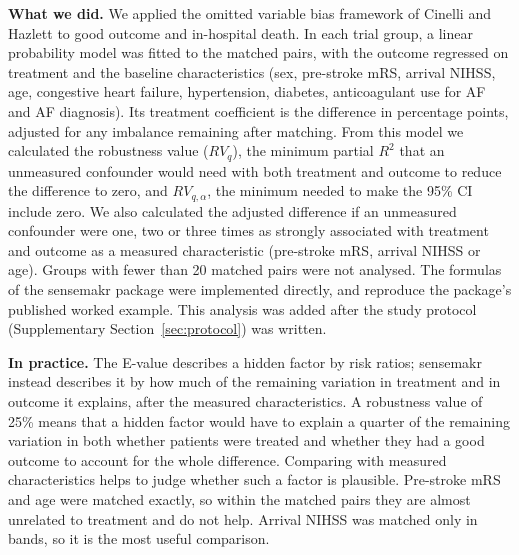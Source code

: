 \textbf{What we did.} We applied the omitted variable bias framework of Cinelli and Hazlett\cite{cinelli_making_2020} to good outcome and in-hospital death. In each trial group, a linear probability model was fitted to the matched pairs, with the outcome regressed on treatment and the baseline characteristics (sex, pre-stroke mRS, arrival NIHSS, age, congestive heart failure, hypertension, diabetes, anticoagulant use for AF and AF diagnosis). Its treatment coefficient is the difference in percentage points, adjusted for any imbalance remaining after matching. From this model we calculated the robustness value ($RV_q$), the minimum partial $R^2$ that an unmeasured confounder would need with both treatment and outcome to reduce the difference to zero, and $RV_{q,\alpha}$, the minimum needed to make the 95\% CI include zero. We also calculated the adjusted difference if an unmeasured confounder were one, two or three times as strongly associated with treatment and outcome as a measured characteristic (pre-stroke mRS, arrival NIHSS or age). Groups with fewer than 20 matched pairs were not analysed. The formulas of the sensemakr package were implemented directly, and reproduce the package's published worked example. This analysis was added after the study protocol (Supplementary Section~\ref{sec:protocol}) was written.

\textbf{In practice.} The E-value describes a hidden factor by risk ratios; sensemakr instead describes it by how much of the remaining variation in treatment and in outcome it explains, after the measured characteristics. A robustness value of 25\% means that a hidden factor would have to explain a quarter of the remaining variation in both whether patients were treated and whether they had a good outcome to account for the whole difference. Comparing with measured characteristics helps to judge whether such a factor is plausible. Pre-stroke mRS and age were matched exactly, so within the matched pairs they are almost unrelated to treatment and do not help. Arrival NIHSS was matched only in bands, so it is the most useful comparison.

